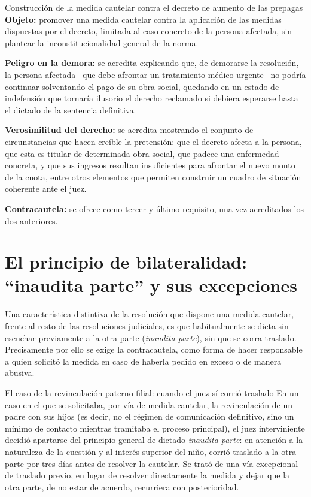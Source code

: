 \documentclass[12pt,oneside]{book}
\begin{document}
\begin{example}{Construcción de la medida cautelar contra el decreto de aumento de las prepagas}
\textbf{Objeto:} promover una medida cautelar contra la aplicación de las medidas dispuestas por el decreto, limitada al caso concreto de la persona afectada, sin plantear la inconstitucionalidad general de la norma.

\textbf{Peligro en la demora:} se acredita explicando que, de demorarse la resolución, la persona afectada --que debe afrontar un tratamiento médico urgente-- no podría continuar solventando el pago de su obra social, quedando en un estado de indefensión que tornaría ilusorio el derecho reclamado si debiera esperarse hasta el dictado de la sentencia definitiva.

\textbf{Verosimilitud del derecho:} se acredita mostrando el conjunto de circunstancias que hacen creíble la pretensión: que el decreto afecta a la persona, que esta es titular de determinada obra social, que padece una enfermedad concreta, y que sus ingresos resultan insuficientes para afrontar el nuevo monto de la cuota, entre otros elementos que permiten construir un cuadro de situación coherente ante el juez.

\textbf{Contracautela:} se ofrece como tercer y último requisito, una vez acreditados los dos anteriores.
\end{example}

\section{El principio de bilateralidad: ``inaudita parte'' y sus excepciones}

\begin{important}
Una característica distintiva de la resolución que dispone una medida cautelar, frente al resto de las resoluciones judiciales, es que habitualmente se dicta sin escuchar previamente a la otra parte (\textit{inaudita parte}), sin que se corra traslado. Precisamente por ello se exige la contracautela, como forma de hacer responsable a quien solicitó la medida en caso de haberla pedido en exceso o de manera abusiva.
\end{important}

\begin{example}{El caso de la revinculación paterno-filial: cuando el juez sí corrió traslado}
En un caso en el que se solicitaba, por vía de medida cautelar, la revinculación de un padre con sus hijos (es decir, no el régimen de comunicación definitivo, sino un mínimo de contacto mientras tramitaba el proceso principal), el juez interviniente decidió apartarse del principio general de dictado \textit{inaudita parte}: en atención a la naturaleza de la cuestión y al interés superior del niño, corrió traslado a la otra parte por tres días antes de resolver la cautelar. Se trató de una vía excepcional de traslado previo, en lugar de resolver directamente la medida y dejar que la otra parte, de no estar de acuerdo, recurriera con posterioridad.
\end{example}
\end{document}
